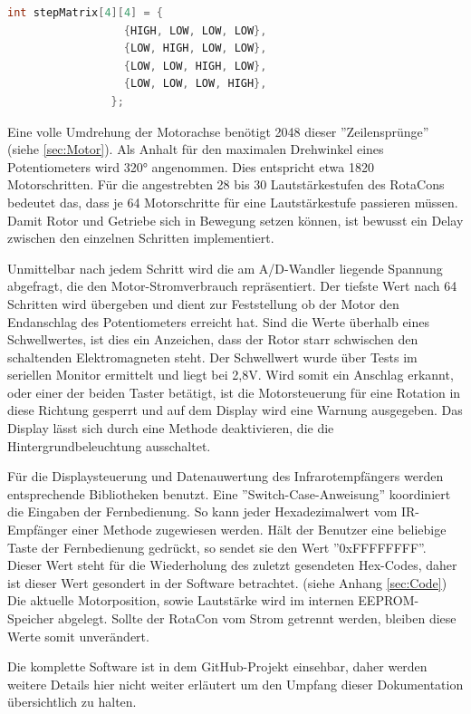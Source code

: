 \documentclass[11pt, titlepage, fleqn]{report}
\begin{document}
			\begin{lstlisting}[gobble=28, language=C++]
				int stepMatrix[4][4] = {
  				  {HIGH, LOW, LOW, LOW},
  				  {LOW, HIGH, LOW, LOW},
  				  {LOW, LOW, HIGH, LOW},
  				  {LOW, LOW, LOW, HIGH},
				};
			\end{lstlisting}

			Eine volle Umdrehung der Motorachse benötigt 2048 dieser ''Zeilensprünge'' (siehe \ref{sec:Motor}). Als Anhalt für den maximalen Drehwinkel eines Potentiometers wird 320° angenommen. Dies entspricht etwa 1820 Motorschritten. Für die angestrebten 28 bis 30 Lautstärkestufen des RotaCons bedeutet das, dass je 64 Motorschritte für eine Lautstärkestufe passieren müssen. Damit Rotor und Getriebe sich in Bewegung setzen können, ist bewusst ein Delay zwischen den einzelnen Schritten implementiert.

			Unmittelbar nach jedem Schritt wird die am A/D-Wandler liegende Spannung abgefragt, die den Motor-Stromverbrauch repräsentiert. Der tiefste Wert nach 64 Schritten wird übergeben und dient zur Feststellung ob der Motor den Endanschlag des Potentiometers erreicht hat. Sind die Werte überhalb eines Schwellwertes, ist dies ein Anzeichen, dass der Rotor starr schwischen den schaltenden Elektromagneten steht. Der Schwellwert wurde über Tests im seriellen Monitor ermittelt und liegt bei 2,8V.\newline
			Wird somit ein Anschlag erkannt, oder einer der beiden Taster betätigt, ist die Motorsteuerung für eine Rotation in diese Richtung gesperrt und auf dem Display wird eine Warnung ausgegeben. Das Display lässt sich durch eine Methode deaktivieren, die die Hintergrundbeleuchtung ausschaltet.

			Für die Displaysteuerung und Datenauwertung des Infrarotempfängers werden entsprechende Bibliotheken benutzt. Eine ''Switch-Case-Anweisung'' koordiniert die Eingaben der Fernbedienung. So kann jeder Hexadezimalwert vom IR-Empfänger einer Methode zugewiesen werden. Hält der Benutzer eine beliebige Taste der Fernbedienung gedrückt, so sendet sie den Wert ''0xFFFFFFFF''. Dieser Wert steht für die Wiederholung des zuletzt gesendeten Hex-Codes, daher ist dieser Wert gesondert in der Software betrachtet. (siehe Anhang \ref{sec:Code}) 
			Die aktuelle Motorposition, sowie Lautstärke wird im internen EEPROM-Speicher abgelegt. Sollte der RotaCon vom Strom getrennt werden, bleiben diese Werte somit unverändert.
			
			Die komplette Software ist in dem GitHub-Projekt einsehbar, daher werden weitere Details hier nicht weiter erläutert um den Umpfang dieser Dokumentation übersichtlich zu halten.
		\newpage
\end{document}
